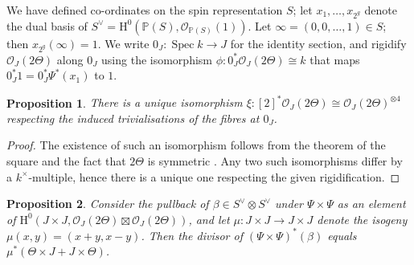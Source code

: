 \documentclass{article} %
\newtheorem{proposition}{Proposition}[section]
\numberwithin{equation}{section}
\DeclareMathOperator{\Spec}{Spec}
\renewcommand{\P}{\mathbb{P}}
\renewcommand{\O}{\mathcal{O}}
\newcommand{\HH}{\mathrm{H}}
\newcommand{\cO}{\mathcal{O}}
\begin{document}
We have defined co-ordinates on the spin representation $S$; let $x_1, \dots, x_{2^g}$ denote the dual basis of $S^\vee = \HH^0(\P(S), \cO_{\P(S)}(1))$. Let $\infty = (0, 0, \dots, 1) \in S$; then $x_{2^g}(\infty) = 1$. We write $0_J : \Spec k \to J$ for the identity section, and  rigidify $\cO_J(2 \Theta)$ along $0_J$ using the isomorphism $\phi : 0_J^\ast \O_J(2 \Theta) \cong k$ that maps $0_J^\ast 1 = 0_J^\ast \Psi^\ast(x_1)$ to $1$.  
\begin{proposition}\label{prop_normalised_isomorphism}
    There is a unique isomorphism $\xi : [2]^\ast \O_J(2 \Theta) \cong \O_J(2 \Theta)^{\otimes 4}$ respecting the induced trivialisations of the fibres at $0_J$.
\end{proposition}
\begin{proof}
    The existence of such an isomorphism follows from the theorem of the square and the fact that $2 \Theta$ is symmetric \cite[\S 6, Corollary 3]{Mum66}. 
    Any two such isomorphisms differ by a $k^{\times}$-multiple, hence there is a unique one respecting the given rigidification. 
\end{proof}
\begin{proposition}\label{prop_beta_as_a_pullback_of_theta}
    Consider the pullback of $\beta \in S^\vee \otimes S^\vee$ under $\Psi \times \Psi$ as an element of $\HH^0(J \times J, \O_J(2 \Theta) \boxtimes \O_J(2 \Theta))$, and let $\mu : J \times J \to J \times J$ denote the isogeny $\mu(x, y) = (x+y, x-y)$. Then the divisor of $(\Psi \times \Psi)^\ast(\beta)$ equals $\mu^{\ast}( \Theta \times J + J \times \Theta)$.
\end{proposition}
\end{document}
